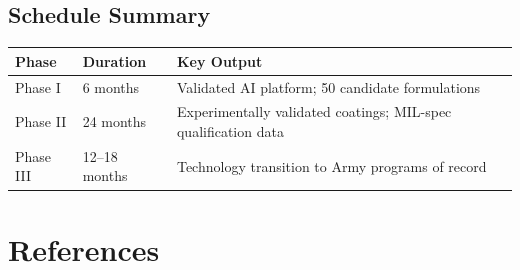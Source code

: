 \documentclass[11pt,letterpaper]{article}
\begin{document}
\subsection{Schedule Summary}

\begin{center}
\begin{tabular}{lll}
\toprule
\textbf{Phase} & \textbf{Duration} & \textbf{Key Output} \\
\midrule
Phase I & 6 months & Validated AI platform; 50 candidate formulations \\
Phase II & 24 months & Experimentally validated coatings; MIL-spec qualification data \\
Phase III & 12--18 months & Technology transition to Army programs of record \\
\bottomrule
\end{tabular}
\end{center}


\section{References}
\label{sec:references}
\end{document}
